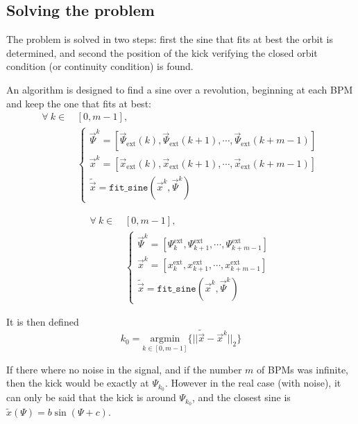\subsection{Solving the problem}

The problem is solved in two steps: first the sine that fits at best the orbit is determined, and second the position of the kick verifying the closed orbit condition (or continuity condition) is found.

An algorithm is designed to find a sine over a revolution, beginning at each BPM and keep the one that fits at best:
\begin{align}
\forall~k \in \, &[0,m-1], \nonumber \\
&\begin{cases}
\vec{\Psi}^k = [\vec{\Psi}_\mathrm{ext}(k), \vec{\Psi}_\mathrm{ext}(k+1), \cdots,  \vec{\Psi}_\mathrm{ext}(k+m-1)]\\
\vec{x}^k = [\vec{x}_\mathrm{ext}(k), \vec{x}_\mathrm{ext}(k+1), \cdots,  \vec{x}_\mathrm{ext}(k+m-1)]\\
\tilde{\vec{x}} = \mathtt{fit\_sine}(\vec{x}^k, \vec{\Psi}^k)
\end{cases}
\end{align}

\begin{align}
\forall~k \in \, &[0,m-1], \nonumber \\
&\begin{cases}
\vec{\Psi}^k = [\Psi^\mathrm{ext}_{k}, \Psi^\mathrm{ext}_{k+1}, \cdots,  \Psi^\mathrm{ext}_{k+m-1}]\\
\vec{x}^k = [x^\mathrm{ext}_{k}, x^\mathrm{ext}_{k+1}, \cdots,  x^\mathrm{ext}_{k+m-1}]\\
\tilde{\vec{x}} = \mathtt{fit\_sine}(\vec{x}^k, \vec{\Psi}^k)
\end{cases}
\end{align}

It is then defined
\begin{equation}
k_0 = \underset{k \in [0, m-1]}{\textrm{argmin}}\{||\tilde{\vec{x}}-\vec{x}^k||_2\}
\end{equation}

If there where no noise in the signal, and if the number $m$ of BPMs was infinite, then the kick would be exactly at $\Psi_{k_0}$. However in the real case (with noise), it can only be said that the kick is around $\Psi_{k_0}$, and the closest sine is $\tilde{x}(\Psi) = b \sin(\Psi + c)$.

